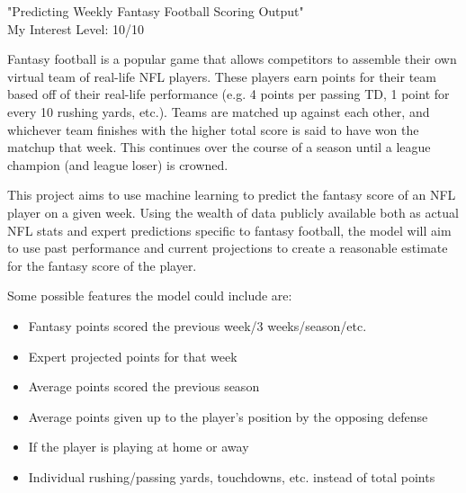 \documentclass[10pt]{homework}
\begin{document}
\maketitle

\begin{center}
    "Predicting Weekly Fantasy Football Scoring Output" \\
    My Interest Level: 10/10
\end{center}


Fantasy football is a popular game that allows competitors to assemble their own virtual team
of real-life NFL players. These players earn points for their team based off of their real-life
performance (e.g. 4 points per passing TD, 1 point for every 10 rushing yards, etc.).
Teams are matched up against each other, and whichever team finishes with the higher 
total score is said to have won the matchup that week. This continues over the course of a season
until a league champion (and league loser) is crowned.

This project aims to use machine learning to predict the fantasy score of an NFL
player on a given week. Using the wealth of data publicly available both as actual NFL stats
and expert predictions specific to fantasy football, the model will aim to use past performance
and current projections to create a reasonable estimate for the fantasy score of the player.


Some possible features the model could include are:

\begin{multicols}{2}
    \begin{itemize}
        \item Fantasy points scored the previous week/3 weeks/season/etc.
        \item Expert projected points for that week
        \item Average points scored the previous season
        \item Average points given up to the player's position by the opposing defense
        \item If the player is playing at home or away
        \item Individual rushing/passing yards, touchdowns, etc. instead of total points
    \end{itemize}
\end{multicols}
\end{document}
